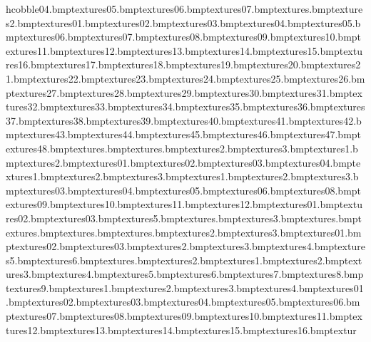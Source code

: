 hcobble04.bmp textures\pathcobble05.bmp textures\pathcobble06.bmp textures\pathcobble07.bmp textures\pathsnow.bmp textures\pathsnow2.bmp textures\purplerock01.bmp textures\purplerock02.bmp textures\purplerock03.bmp textures\purplerock04.bmp textures\purplerock05.bmp textures\purplerock06.bmp textures\purplerock07.bmp textures\purplerock08.bmp textures\purplerock09.bmp textures\purplerock10.bmp textures\purplerock11.bmp textures\purplerock12.bmp textures\purplerock13.bmp textures\purplerock14.bmp textures\purplerock15.bmp textures\purplerock16.bmp textures\purplerock17.bmp textures\purplerock18.bmp textures\purplerock19.bmp textures\purplerock20.bmp textures\purplerock21.bmp textures\purplerock22.bmp textures\purplerock23.bmp textures\purplerock24.bmp textures\purplerock25.bmp textures\purplerock26.bmp textures\purplerock27.bmp textures\purplerock28.bmp textures\purplerock29.bmp textures\purplerock30.bmp textures\purplerock31.bmp textures\purplerock32.bmp textures\purplerock33.bmp textures\purplerock34.bmp textures\purplerock35.bmp textures\purplerock36.bmp textures\purplerock37.bmp textures\purplerock38.bmp textures\purplerock39.bmp textures\purplerock40.bmp textures\purplerock41.bmp textures\purplerock42.bmp textures\purplerock43.bmp textures\purplerock44.bmp textures\purplerock45.bmp textures\purplerock46.bmp textures\purplerock47.bmp textures\purplerock48.bmp textures\railings.bmp textures\reeds.bmp textures\reeds2.bmp textures\reeds3.bmp textures\safaribannervines1.bmp textures\safaribannervines2.bmp textures\safarirockbanner01.bmp textures\safarirockbanner02.bmp textures\safarirockbanner03.bmp textures\safarirockbanner04.bmp textures\safaristepsand1.bmp textures\safaristepsand2.bmp textures\safaristepsand3.bmp textures\safaristepstriangles1.bmp textures\safaristepstriangles2.bmp textures\safaristepstriangles3.bmp textures\safaritemple03.bmp textures\safaritemple04.bmp textures\safaritemple05.bmp textures\safaritemple06.bmp textures\safaritemple08.bmp textures\safaritemple09.bmp textures\safaritemple10.bmp textures\safaritemple11.bmp textures\safaritemple12.bmp textures\safaritemplefloor01.bmp textures\safaritemplefloor02.bmp textures\safaritemplefloor03.bmp textures\safe5.bmp textures\safeback.bmp textures\safeside3.bmp textures\safsamface.bmp textures\safwheel.bmp textures\safwheelgrip.bmp textures\sand.bmp textures\sand2.bmp textures\sand3.bmp textures\sandbeach01.bmp textures\sandbeach02.bmp textures\sandbeach03.bmp textures\sandbed2.bmp textures\sandbed3.bmp textures\sandbed4.bmp textures\sandbed5.bmp textures\sandbed6.bmp textures\sandbedrock.bmp textures\sandbedrock2.bmp textures\sandcastle1.bmp textures\sandcastle2.bmp textures\sandcastle3.bmp textures\sandcastle4.bmp textures\sandcastle5.bmp textures\sandcastle6.bmp textures\sandcastle7.bmp textures\sandcastle8.bmp textures\sandcastle9.bmp textures\sandedge1.bmp textures\sandedge2.bmp textures\sandedge3.bmp textures\sandedge4.bmp textures\sandrock01.bmp textures\sandrock02.bmp textures\sandrock03.bmp textures\sandrock04.bmp textures\sandrock05.bmp textures\sandrock06.bmp textures\sandrock07.bmp textures\sandrock08.bmp textures\sandrock09.bmp textures\sandrock10.bmp textures\sandrock11.bmp textures\sandrock12.bmp textures\sandrock13.bmp textures\sandrock14.bmp textures\sandrock15.bmp textures\sandrock16.bmp textur
